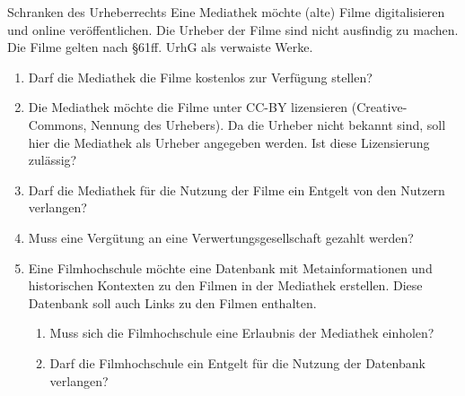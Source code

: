 \documentclass{article}
\begin{document}
\begin{exercise}{Schranken des Urheberrechts}
  Eine Mediathek möchte (alte) Filme digitalisieren und online veröffentlichen. Die Urheber der Filme sind nicht ausfindig zu machen. Die Filme gelten nach §61ff. UrhG als verwaiste Werke.
  \begin{enumerate}
    \item Darf die Mediathek die Filme kostenlos zur Verfügung stellen?
    \item Die Mediathek möchte die Filme unter CC-BY lizensieren (Creative-Commons, Nennung des Urhebers). Da die Urheber nicht bekannt sind, soll hier die Mediathek als Urheber angegeben werden. Ist diese Lizensierung zulässig?
    \item Darf die Mediathek für die Nutzung der Filme ein Entgelt von den Nutzern verlangen?
    \item Muss eine Vergütung an eine Verwertungsgesellschaft gezahlt werden?
    \item Eine Filmhochschule möchte eine Datenbank mit Metainformationen und historischen Kontexten zu den Filmen in der Mediathek erstellen. Diese Datenbank soll auch Links zu den Filmen enthalten.
          \begin{enumerate}
            \item Muss sich die Filmhochschule eine Erlaubnis der Mediathek einholen?
            \item Darf die Filmhochschule ein Entgelt für die Nutzung der Datenbank verlangen?
          \end{enumerate}
  \end{enumerate}


\end{exercise}
\end{document}
